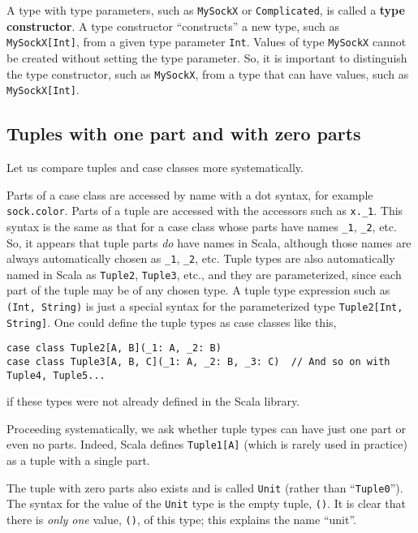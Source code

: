 A type with type parameters, such as \lstinline!MySockX! or \lstinline!Complicated!,
is called a \textbf{type constructor}. A
type constructor ``constructs'' a new type, such as \lstinline!MySockX[Int]!,
from a given type parameter \lstinline!Int!. Values of type \lstinline!MySockX!
cannot be created without setting the type parameter. So, it is important
to distinguish the type constructor, such as \lstinline!MySockX!,
from a type that can have values, such as \lstinline!MySockX[Int]!.

\subsection{Tuples with one part and with zero parts}

Let us compare tuples and case classes more systematically.

Parts of a case class are accessed by name with a dot syntax, for
example \lstinline!sock.color!. Parts of a tuple are accessed with
the accessors such as \lstinline!x._1!. This syntax is the same as
that for a case class whose parts have names \lstinline!_1!, \lstinline!_2!,
etc. So, it appears that tuple parts \emph{do} have names in Scala,
although those names are always automatically chosen as \lstinline!_1!,
\lstinline!_2!, etc. Tuple types are also automatically named in
Scala as \lstinline!Tuple2!, \lstinline!Tuple3!, etc., and they
are parameterized, since each part of the tuple may be of any chosen
type. A tuple type expression such as \lstinline!(Int, String)! is
just a special syntax for the parameterized type \lstinline!Tuple2[Int, String]!.
One could define the tuple types as case classes like this,
\begin{lstlisting}
case class Tuple2[A, B](_1: A, _2: B)
case class Tuple3[A, B, C](_1: A, _2: B, _3: C)  // And so on with Tuple4, Tuple5...
\end{lstlisting}
if these types were not already defined in the Scala library.

Proceeding systematically, we ask whether tuple types can have just
one part or even no parts. Indeed, Scala defines \lstinline!Tuple1[A]!
(which is rarely used in practice) as a tuple with a single part.

The tuple with zero parts also exists and is called \lstinline!Unit!
(rather than ``\lstinline!Tuple0!''). The syntax for the value
of the \lstinline!Unit! type is the empty tuple, \lstinline!()!.
It is clear that there is \emph{only one} value, \lstinline!()!,
of this type; this explains the name ``unit''. 


